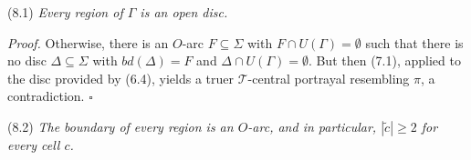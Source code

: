 \stmt
(8.1) \textit{Every region of $\Gamma$ is an open disc.}

\textit{Proof.} Otherwise, there is an $O$-arc $F \subseteq \Sigma$ with $F \cap U(\Gamma) = \emptyset$ such that there is no disc $\Delta \subseteq \Sigma$ with $bd(\Delta) = F$ and $\Delta \cap U(\Gamma) = \emptyset$. But then (7.1), applied to the disc provided by (6.4), yields a truer $\mathcal{T}$-central portrayal resembling $\pi$, a contradiction. $\square$

\stmt
(8.2) \textit{The boundary of every region is an $O$-arc, and in particular, $|\tilde{c}| \ge 2$ for every cell $c$.}
